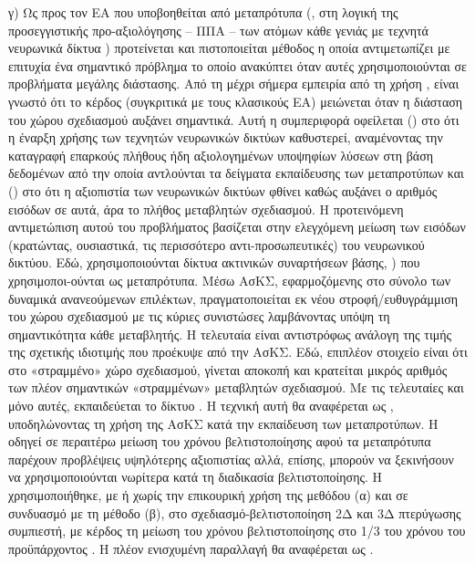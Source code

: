 	γ) Ως προς τον ΕΑ που υποβοηθείται από μεταπρότυπα (, στη λογική της προσεγγιστικής προ-αξιολόγησης – ΠΠΑ – των ατόμων κάθε γενιάς με τεχνητά νευρωνικά δίκτυα \cite{LTT_2_018,LTT_2_020,LTT_2_029}) προτείνεται και πιστοποιείται μέθοδος η οποία αντιμετωπίζει με επιτυχία ένα σημαντικό πρόβλημα το οποίο ανακύπτει όταν αυτές χρησιμοποιούνται σε προβλήματα μεγάλης διάστασης. Από τη μέχρι σήμερα εμπειρία από τη χρήση , είναι γνωστό ότι το κέρδος (συγκριτικά με τους κλασικούς ΕΑ) μειώνεται όταν η διάσταση του χώρου σχεδιασμού αυξάνει σημαντικά. Αυτή η συμπεριφορά οφείλεται () στο ότι η έναρξη χρήσης των τεχνητών νευρωνικών δικτύων καθυστερεί, αναμένοντας την καταγραφή επαρκούς πλήθους ήδη αξιολογημένων υποψηφίων λύσεων στη βάση δεδομένων από την οποία αντλούνται τα δείγματα εκπαίδευσης των μεταπροτύπων και () στο ότι η αξιοπιστία των νευρωνικών δικτύων φθίνει καθώς αυξάνει ο αριθμός εισόδων σε αυτά, άρα το πλήθος μεταβλητών σχεδιασμού. Η προτεινόμενη αντιμετώπιση αυτού του προβλήματος βασίζεται στην ελεγχόμενη μείωση των εισόδων (κρατώντας, ουσιαστικά, τις περισσότερο αντι-προσωπευτικές) του νευρωνικού δικτύου. Εδώ, χρησιμοποιούνται δίκτυα ακτινικών συναρτήσεων βάσης, \cite{Haykin}) που χρησιμοποι-ούνται  ως μεταπρότυπα.  Μέσω ΑσΚΣ, εφαρμοζόμενης στο σύνολο των δυναμικά ανανεούμενων επιλέκτων, πραγματοποιείται εκ νέου στροφή/ευθυγράμμιση του χώρου σχεδιασμού με τις κύριες συνιστώσες λαμβάνοντας υπόψη τη σημαντικότητα κάθε μεταβλητής. Η τελευταία είναι αντιστρόφως ανάλογη της τιμής της σχετικής ιδιοτιμής που προέκυψε από την ΑσΚΣ. Εδώ, επιπλέον στοιχείο είναι ότι στο «στραμμένο» χώρο σχεδιασμού, γίνεται αποκοπή και κρατείται μικρός αριθμός των πλέον σημαντικών «στραμμένων» μεταβλητών σχεδιασμού. Με τις τελευταίες και μόνο αυτές, εκπαιδεύεται το δίκτυο . Η τεχνική αυτή θα αναφέρεται ως , υποδηλώνοντας τη χρήση της ΑσΚΣ κατά την εκπαίδευση των μεταπροτύπων. Η  οδηγεί σε περαιτέρω μείωση του χρόνου βελτιστοποίησης αφού τα μεταπρότυπα παρέχουν προβλέψεις υψηλότερης αξιοπιστίας αλλά, επίσης, μπορούν να  ξεκινήσουν να χρησιμοποιούνται νωρίτερα κατά τη διαδικασία βελτιστοποίησης. Η  χρησιμοποιήθηκε, με ή χωρίς την επικουρική χρήση της μεθόδου (α) και σε συνδυασμό με τη μέθοδο (β), στο σχεδιασμό-βελτιστοποίηση 2Δ και 3Δ πτερύγωσης συμπιεστή, με κέρδος τη μείωση του χρόνου βελτιστοποίησης στο 1/3 του χρόνου του προϋπάρχοντος  . Η πλέον ενισχυμένη παραλλαγή θα αναφέρεται ως .
	       
